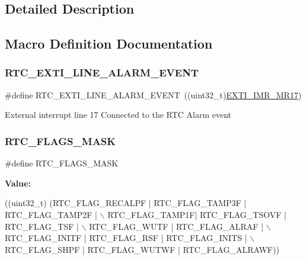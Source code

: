 \subsection{Detailed Description}


\subsection{Macro Definition Documentation}
\mbox{\label{group___r_t_c___private___constants_gaeffe9b89372b06df1c0eff2f4346682b}} 
\subsubsection{\texorpdfstring{R\+T\+C\+\_\+\+E\+X\+T\+I\+\_\+\+L\+I\+N\+E\+\_\+\+A\+L\+A\+R\+M\+\_\+\+E\+V\+E\+NT}{RTC\_EXTI\_LINE\_ALARM\_EVENT}}
{\footnotesize\ttfamily \#define R\+T\+C\+\_\+\+E\+X\+T\+I\+\_\+\+L\+I\+N\+E\+\_\+\+A\+L\+A\+R\+M\+\_\+\+E\+V\+E\+NT~((uint32\+\_\+t)\hyperlink{group___peripheral___registers___bits___definition_ga4489fa85d1552b8f40faed93483a5d35}{E\+X\+T\+I\+\_\+\+I\+M\+R\+\_\+\+M\+R17})}

External interrupt line 17 Connected to the R\+TC Alarm event \mbox{\label{group___r_t_c___private___constants_ga0c7513e50528d7b5a52e88340a4e7b25}} 
\subsubsection{\texorpdfstring{R\+T\+C\+\_\+\+F\+L\+A\+G\+S\+\_\+\+M\+A\+SK}{RTC\_FLAGS\_MASK}}
{\footnotesize\ttfamily \#define R\+T\+C\+\_\+\+F\+L\+A\+G\+S\+\_\+\+M\+A\+SK}

{\bfseries Value\+:}
\begin{DoxyCode}
((uint32\_t) (RTC\_FLAG\_RECALPF | RTC\_FLAG\_TAMP3F | RTC\_FLAG\_TAMP2F | \(\backslash\)
                                             RTC\_FLAG\_TAMP1F| RTC\_FLAG\_TSOVF | RTC\_FLAG\_TSF       | \(\backslash\)
                                             RTC\_FLAG\_WUTF  | RTC\_FLAG\_ALRAF      | \(\backslash\)
                                             RTC\_FLAG\_INITF | RTC\_FLAG\_RSF | RTC\_FLAG\_INITS       | \(\backslash\)
                                             RTC\_FLAG\_SHPF | RTC\_FLAG\_WUTWF | RTC\_FLAG\_ALRAWF))
\end{DoxyCode}

